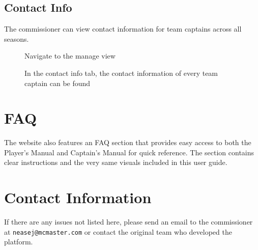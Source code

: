 \documentclass{article}
\begin{document}
\subsection{Contact Info}
The commissioner can view contact information for team captains across all seasons.

\begin{figure}[H]
    \centering
    \caption{Navigate to the manage view}
\end{figure}

\begin{figure}[H]
    \centering
    \caption{In the contact info tab, the contact information of every team captain can be found}
\end{figure}




\section{FAQ}
The website also features an FAQ section that provides easy access to both the Player's Manual and Captain's Manual for quick reference. The section contains clear instructions and the very same visuals included in this user guide.

\section{Contact Information}
If there are any issues not listed here, please send an email to the commissioner at \texttt{neasej@mcmaster.com} or contact the original team who developed the platform.
\end{document}
